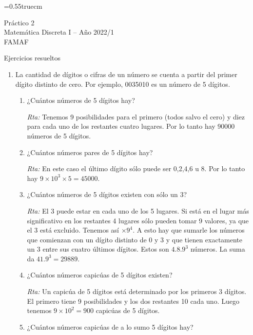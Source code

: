 \documentclass[a4paper,12pt,twoside,spanish,reqno]{amsbook}
\numberwithin{equation}{section}
\begin{document}
    \baselineskip=0.55truecm %
    
{\bf \begin{center} Práctico 2 \\ Matemática Discreta I -- Año 2022/1 \\ FAMAF \end{center}}

{\bf \begin{center} Ejercicios resueltos \end{center}}

\begin{enumerate}
\setlength\itemsep{1.1em}

\item  La cantidad de dígitos o cifras de un número se cuenta a partir del primer dígito
distinto de cero. Por ejemplo, 0035010 es un número de 5 dígitos.
\begin{enumerate}
\item ¿Cuántos números de 5 dígitos hay?

\textit{Rta:} Tenemos 9 posibilidades para el primero (todos salvo el cero) y diez para cada uno de los restantes cuatro lugares. Por lo tanto hay 90000 números de 5 dígitos.

\item ¿Cuántos números pares de 5 dígitos hay?

\textit{Rta:} En este caso el último dígito sólo puede ser 0,2,4,6 u 8. Por lo tanto hay $9\times 10^3\times 5= 45000$.

\item ¿Cuántos números de 5 dígitos existen con sólo un 3?

\noindent\textit{Rta:} El 3 puede estar en cada uno de los 5 lugares. Si está en el lugar más significativo en los restantes 4 lugares sólo pueden tomar 9 valores, ya que el 3 está excluido. Tenemos así $\times 9^4.$ A esto hay que sumarle los números que comienzan con un dígito distinto de 0 y 3 y que tienen exactamente un 3 entre sus cuatro últimos dígitos. Estos son $4.8.9^3$ números. La suma da $41.9^3=29889$.

\item ¿Cuántos números capicúas de 5 dígitos existen?

\textit{Rta:} Un capicúa de 5 dígitos está determinado por los primeros 3 dígitos. El primero tiene 9 posibilidades y los dos restantes 10 cada uno. Luego tenemos $9\times 10^2=900 $ capicúas de 5 dígitos.

\item ¿Cuántos números capicúas de a lo sumo 5 dígitos hay?


\end{enumerate}
\end{enumerate}
\end{document}

